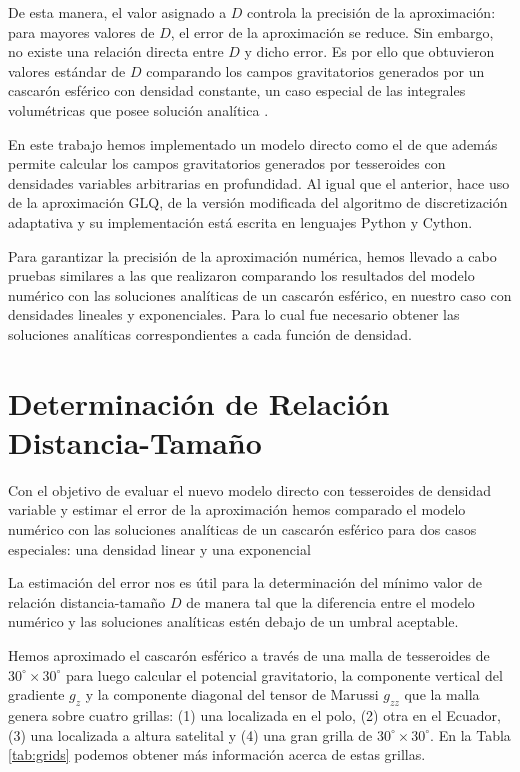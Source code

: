 \documentclass[a4paper,10pt]{article}
\begin{document}
De esta manera, el valor asignado a $D$ controla la precisión de la aproximación: para mayores valores de $D$, el error de la aproximación se reduce.
Sin embargo, no existe una relación directa entre $D$ y dicho error.
Es por ello que \citet{Uieda2016} obtuvieron valores estándar de $D$ comparando los campos gravitatorios generados por un cascarón esférico con densidad constante, un caso especial de las integrales volumétricas que posee solución analítica \citep{LaFehr1991, Mikuska2006, Grombein2013}.

En este trabajo hemos implementado un modelo directo como el de \citet{Uieda2016} que además permite calcular los campos gravitatorios generados por tesseroides con densidades variables arbitrarias en profundidad.
Al igual que el anterior, hace uso de la aproximación GLQ, de la versión modificada del algoritmo de discretización adaptativa y su implementación está escrita en lenguajes Python y Cython.

Para garantizar la precisión de la aproximación numérica, hemos llevado a cabo pruebas similares a las que realizaron \citet{Uieda2016} comparando los resultados del modelo numérico con las soluciones analíticas de un cascarón esférico, en nuestro caso con densidades lineales y exponenciales.
Para lo cual fue necesario obtener las soluciones analíticas correspondientes a cada función de densidad.


\section{Determinación de Relación Distancia-Tamaño}

Con el objetivo de evaluar el nuevo modelo directo con tesseroides de densidad variable y estimar el error de la aproximación hemos comparado el modelo numérico con las soluciones analíticas de un cascarón esférico para dos casos especiales: una densidad linear y una exponencial

La estimación del error nos es útil para la determinación del mínimo valor de relación distancia-tamaño $D$ de manera tal que la diferencia entre el modelo numérico y las soluciones analíticas estén debajo de un umbral aceptable.

Hemos aproximado el cascarón esférico a través de una malla de tesseroides de $30^\circ \times 30^\circ$ para luego calcular el potencial gravitatorio, la componente vertical del gradiente $g_z$ y la componente diagonal del tensor de Marussi $g_{zz}$ que la malla genera sobre cuatro grillas: (1) una localizada en el polo, (2) otra en el Ecuador, (3) una localizada a altura satelital y (4) una gran grilla de $30^\circ \times 30^\circ$.
En la Tabla \ref{tab:grids} podemos obtener más información acerca de estas grillas.
\end{document}
